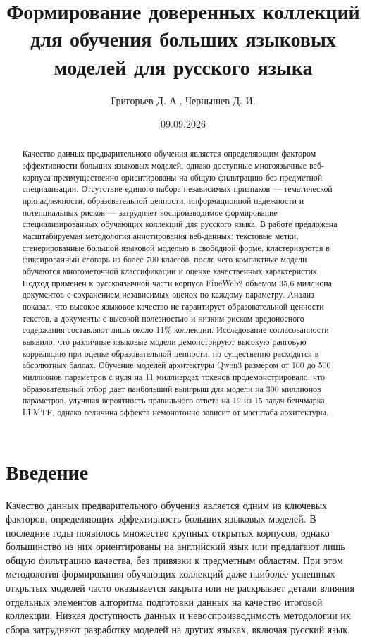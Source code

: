 \documentclass[12pt,a4paper]{article}
\title{Формирование доверенных коллекций для обучения больших языковых моделей для русского языка}
\author{Григорьев Д. А., Чернышев Д. И.}
\date{09.09.2026}
\begin{document}
\sloppy

\maketitle

\begin{abstract}
Качество данных предварительного обучения является определяющим фактором эффективности 
больших языковых моделей, однако доступные многоязычные веб-корпуса преимущественно 
ориентированы на общую фильтрацию без предметной специализации. 
Отсутствие единого набора независимых признаков — тематической принадлежности, 
образовательной ценности, информационной надежности и потенциальных рисков 
— затрудняет воспроизводимое формирование специализированных обучающих коллекций для русского языка.
В работе предложена масштабируемая методология аннотирования веб-данных: 
текстовые метки, сгенерированные большой языковой моделью в свободной форме, кластеризуются 
в фиксированный словарь из более 700 классов, после чего 
компактные модели обучаются многометочной классификации и оценке качественных характеристик.
Подход применен к русскоязычной части корпуса FineWeb2 объемом 35,6 миллиона документов 
с сохранением независимых оценок по каждому параметру.
Анализ показал, что высокое языковое качество не гарантирует образовательной ценности текстов, 
а документы с высокой полезностью и низким риском вредоносного содержания составляют лишь около 11\% 
коллекции. Исследование согласованности выявило, что различные языковые 
модели демонстрируют высокую ранговую корреляцию при оценке образовательной ценности, 
но существенно расходятся в абсолютных баллах. Обучение моделей архитектуры 
Qwen3 размером от 100 до 500 миллионов параметров 
с нуля на 11 миллиардах токенов продемонстрировало, что образовательный отбор 
дает наибольший выигрыш для модели на 300 миллионов параметров, улучшая вероятность 
правильного ответа на 12 из 15 задач бенчмарка LLMTF, однако величина эффекта немонотонно 
зависит от масштаба архитектуры.
\end{abstract}

\section{Введение}
Качество данных предварительного обучения является одним из ключевых факторов, определяющих эффективность больших языковых моделей. 
В последние годы появилось множество крупных открытых корпусов, 
однако большинство из них ориентированы на английский язык или предлагают лишь общую фильтрацию качества, 
без привязки к предметным областям. 
При этом методология формирования обучающих коллекций даже наиболее успешных открытых моделей часто 
оказывается закрыта или не раскрывает детали влияния отдельных элементов алгоритма
 подготовки данных на качество итоговой коллекции. 
 Низкая доступность данных и невоспроизводимость методологии их сбора 
 затрудняют разработку моделей на других языках, включая русский язык.
\end{document}
